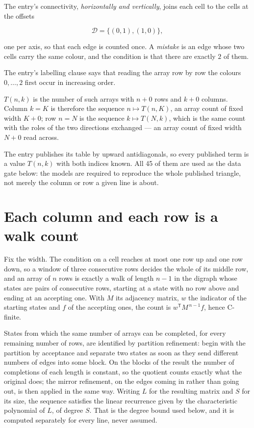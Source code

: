 \documentclass[11pt]{article}
\theoremstyle{definition}
\begin{document}
The entry's connectivity, {\itshape horizontally and vertically}, joins each cell to the cells at the offsets

\[\mathcal{D} = \{(0,1), (1,0)\},\]

one per axis, so that each edge is counted once. A {\itshape mistake} is an edge whose two cells carry the same colour, and the condition is that there are exactly $2$ of them.

The entry's labelling clause says that reading the array row by row the colours $0,\dots,2$ first occur in increasing order.

$T(n,k)$ is the number of such arrays with $n + 0$ rows and $k + 0$ columns. Column $k = K$ is therefore the sequence $n \mapsto T(n,K)$, an array count of fixed width $K + 0$; row $n = N$ is the sequence $k \mapsto T(N,k)$, which is the same count with the roles of the two directions exchanged --- an array count of fixed width $N + 0$ read across.

The entry publishes its table by upward antidiagonals, so every published term is a value $T(n,k)$ with both indices known. All 45 of them are used as the data gate below: the models are required to reproduce the whole published triangle, not merely the column or row a given line is about.

\section{Each column and each row is a walk count}

Fix the width. The condition on a cell reaches at most one row up and one row down, so a window of three consecutive rows decides the whole of its middle row, and an array of $n$ rows is exactly a walk of length $n-1$ in the digraph whose states are pairs of consecutive rows, starting at a state with no row above and ending at an accepting one. With $M$ its adjacency matrix, $w$ the indicator of the starting states and $f$ of the accepting ones, the count is $w^{\mathsf T}M^{\,n-1}f$, hence C-finite.

States from which the same number of arrays can be completed, for every remaining number of rows, are identified by partition refinement: begin with the partition by acceptance and separate two states as soon as they send different numbers of edges into some block. On the blocks of the result the number of completions of each length is constant, so the quotient counts exactly what the original does; the mirror refinement, on the edges coming in rather than going out, is then applied in the same way. Writing $L$ for the resulting matrix and $S$ for its size, the sequence satisfies the linear recurrence given by the characteristic polynomial of $L$, of degree $S$. That is the degree bound used below, and it is computed separately for every line, never assumed.
\end{document}
